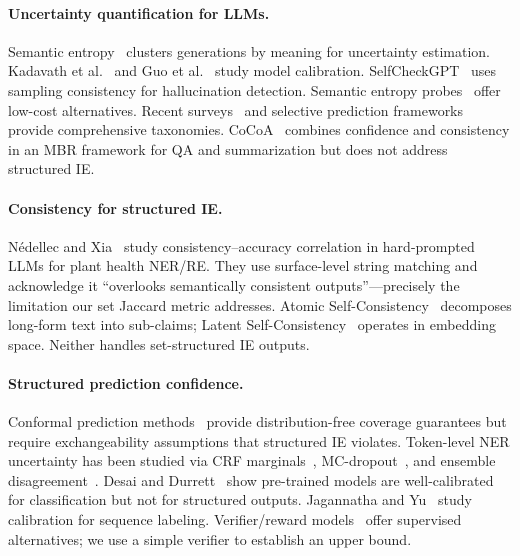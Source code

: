 \documentclass[11pt,a4paper]{article}
\begin{document}
\paragraph{Uncertainty quantification for LLMs.}
Semantic entropy~\cite{kuhn2023semantic} clusters generations by meaning for uncertainty estimation. Kadavath et al.~\cite{kadavath2022language} and Guo et al.~\cite{guo2017calibration} study model calibration. SelfCheckGPT~\cite{manakul2023selfcheckgpt} uses sampling consistency for hallucination detection. Semantic entropy probes~\cite{semanticprobes2024} offer low-cost alternatives. Recent surveys~\cite{uqsurvey2025,uqcalibsurvey2025,confidencesurvey2024} and selective prediction frameworks~\cite{geifman2017selective,knowyourlimits2025} provide comprehensive taxonomies. CoCoA~\cite{cocoa2025} combines confidence and consistency in an MBR framework for QA and summarization but does not address structured IE.

\paragraph{Consistency for structured IE.}
N\'{e}dellec and Xia~\cite{nedellec2026consistency} study consistency--accuracy correlation in hard-prompted LLMs for plant health NER/RE. They use surface-level string matching and acknowledge it ``overlooks semantically consistent outputs''---precisely the limitation our set Jaccard metric addresses. Atomic Self-Consistency~\cite{atomicsc2024} decomposes long-form text into sub-claims; Latent Self-Consistency~\cite{latentsc2025} operates in embedding space. Neither handles set-structured IE outputs.

\paragraph{Structured prediction confidence.}
Conformal prediction methods~\cite{fisch2021conformal,angelopoulos2021sets,bates2021distribution} provide distribution-free coverage guarantees but require exchangeability assumptions that structured IE violates. Token-level NER uncertainty has been studied via CRF marginals~\cite{culotta2004confidence}, MC-dropout~\cite{xiao2019quantifying,gal2016dropout}, and ensemble disagreement~\cite{shelmanov2021certain,lakshminarayanan2017simple}. Desai and Durrett~\cite{desai2020calibration} show pre-trained models are well-calibrated for classification but not for structured outputs. Jagannatha and Yu~\cite{jagannatha2022calibrating} study calibration for sequence labeling. Verifier/reward models~\cite{cobbe2021training,lightman2023lets} offer supervised alternatives; we use a simple verifier to establish an upper bound.
\end{document}
